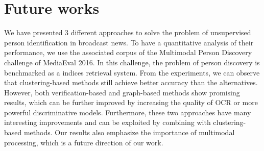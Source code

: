 \section{Future works}
\label{sec:discuss}

We have presented 3 different approaches to solve the problem of unsupervised person identification in broadcast news. To have a quantitative analysis of their performance, we use the associated corpus of the Multimodal Person Discovery challenge of MediaEval 2016. In this challenge, the problem of person discovery is benchmarked as a indices retrieval system.
%
From the experiments, we can observe that clustering-based methods still achieve better accuracy than the alternatives. However, both verification-based and graph-based methods show promising results, which can be further improved by increasing the quality of OCR or more powerful discriminative models. 
%
Furthermore, these two approaches have many interesting improvements and can be exploited by combining with clustering-based methods.
%
Our results also emphasize the importance of multimodal processing, which is a future direction of our work.


\endinput
